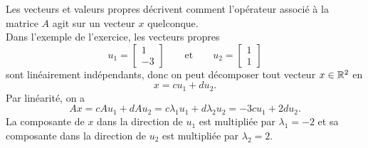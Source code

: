 \remark Les vecteurs et valeurs propres décrivent comment l'opérateur associé à la matrice $A$ agit sur un vecteur $x$ quelconque. \\
Dans l'exemple de l'exercice, les vecteurs propres 
$$
u_1 = \left[\begin{array}{r} 1 \\ -3 \end{array}\right]
\qquad \text{et} \qquad 
u_2 = \left[\begin{array}{r} 1 \\ 1 \end{array}\right]
$$
sont linéairement indépendants, donc on peut décomposer tout vecteur $x \in \mathbb{R}^2$ en
$$
x = c u_1 + d u_2.
$$
Par linéarité, on a 
$$
A x = c A u_1 + d A u_2 = c \lambda_1 u_1 + d \lambda_2 u_2 = -3 c u_1 + 2 d u_2.
$$
La composante de $x$ dans la direction de $u_1$ est multipliée par $\lambda_1 = -2$ et sa composante dans la direction de $u_2$ est multipliée par $\lambda_2 = 2$.


